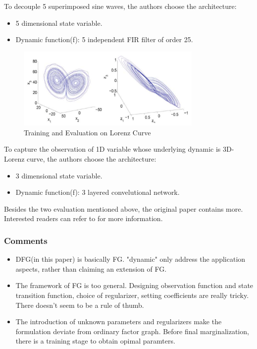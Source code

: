 To decouple 5 superimposed sine waves, the authors choose the architecture:
\begin{itemize}
	\item 5 dimensional state variable. 
	\item Dynamic function(f): 5 independent FIR filter of order 25. 
\end{itemize}

\begin{figure}[htb]
\centering
	\includegraphics[width=0.8\textwidth]{fig/mirowski2009-Lorenz.png}
	\caption{Training and Evaluation on Lorenz Curve}
\end{figure}
To capture the observation of 1D variable whose underlying 
dynamic is 3D-Lorenz curve, the authors choose the architecture:
\begin{itemize}
	\item 3 dimensional state variable. 
	\item Dynamic function(f): 3 layered convelutional network. 
\end{itemize}

Besides the two evaluation mentioned above, the original paper
contains more. Interested readers can refer to \cite{mirowski2009dynamic} for 
more information. 

\subsubsection{Comments}

\begin{itemize}
	\item DFG(in this paper) is basically FG. 
	"dynamic" only address the application aspects, rather 
	than claiming an extension of FG. 
	\item The framework of FG is too general. 
	Designing observation function and state transition function, 
	choice of regularizer, setting coefficients are really tricky.
	There doesn't seem to be a rule of thumb. 
	\item The introduction of unknown parameters and regularizers
	make the formulation deviate from ordinary factor graph. 
	Before final marginalization, there is a training stage 
	to obtain opimal paramters. 
\end{itemize}

